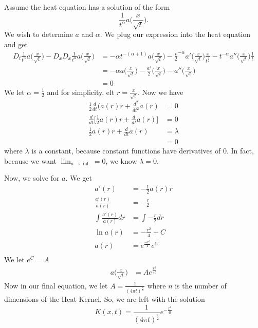 \documentclass[12pt]{article}
\theoremstyle{plain}
\theoremstyle{definition}
\theoremstyle{remark}
\begin{document}
 Assume the heat equation has a solution of the form $$\frac{1}{t^{\alpha}}a\Big(\frac{x}{\sqrt{t}}\Big).$$ We wish to determine $a$ and $\alpha$. 
 We plug our expression into the heat equation and get 
 \begin{align*}
     D_t \frac{1}{t^{\alpha}}a\Big(\frac{x}{\sqrt{t}}\Big) - D_xD_x \frac{1}{t^{\alpha}}a\Big(\frac{x}{\sqrt{t}}\Big) &= -\alpha t^{-(\alpha+1)}a\Big(\frac{x}{\sqrt{t}}\Big)-\frac{t}{2}^{-\alpha}a'\Big(\frac{x}{\sqrt{t}}\Big) \frac{x}{t^{\frac{3}{2}}}-t^{-\alpha} a''\Big(\frac{x}{\sqrt{t}}\Big)\frac{1}{t}\\
     &=-\alpha a \Big(\frac{x}{\sqrt{t}}\Big) -\frac{a'}{2} \Big(\frac{x}{\sqrt{t}}\Big)-a'' \Big(\frac{x}{\sqrt{t}}\Big)\\
     &=0
 \end{align*}
We let $\alpha=\frac{1}{2}$ and for simplicity, elt $r = \frac{x}{\sqrt{t}}$. Now we have \begin{align*}
    \frac{1}{2}\frac{d}{dt}\big(a(r)r+\frac{d^2}{dt^2}a(r) &=0\\
    \frac{d}{dt}\Big[\frac{1}{2}a(r)r+\frac{d}{dt}a(r)\Big] &=0\\
    \frac{1}{2}a(r)r+\frac{d}{dt}a(r)&=\lambda\\
    &=0
\end{align*}
 where $\lambda$ is a constant, because constant functions have derivatives of 0. In fact, because we want $\lim_{a\rightarrow \inf} =0$, we know $\lambda = 0$.
 
 Now, we solve for $a$. We get \begin{align*}
     a'(r) &= -\frac{1}{2}a(r)r\\
     \frac{a'(r)}{a(r)} &= -\frac{r}{2}\\
     \int \frac{a'(r)}{a(r)}dr &= \int -\frac{r}{2} dr\\
     \ln{a(r)} &=-\frac{r^2}{4}+C\\
     a(r) &= e^{\frac{-r^2}{4}}e^C\\
\end{align*}
We let $e^C=A$
\begin{align*}
     a\Big(\frac{x}{\sqrt{t}}\Big)&= Ae^{\frac{x^2}{4t}}
 \end{align*}
Now in our final equation, we let $A=\frac{1}{(4\pi t)^{\frac{n}{2}}}$ where $n$ is the number of dimensions of the Heat Kernel. 
So, we are left with the solution $$K(x,t) = \frac{1}{(4\pi t)^{\frac{1}{2}}} e^{-\frac{x^2}{4t}}$$
\cite{pde}
\end{document}
